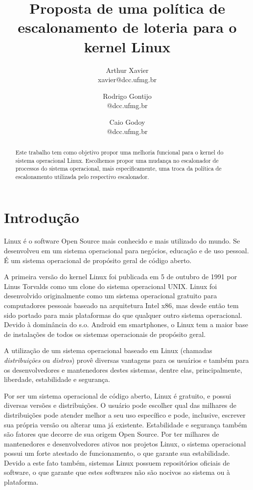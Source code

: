 \documentclass[a4paper,12pt]{article}
\title{Proposta de uma política de escalonamento de loteria para o kernel Linux}
\author{
    Arthur Xavier\\
    \small{xavier@dcc.ufmg.br}
    \and
    Rodrigo Gontijo\\
    \small{@dcc.ufmg.br}
    \and
    Caio Godoy\\
    \small{@dcc.ufmg.br}
}
\begin{document}
\maketitle

\begin{abstract}
  Este trabalho tem como objetivo propor uma melhoria funcional para o kernel do sistema operacional Linux. Escolhemos propor uma mudança no escalonador de processos do sistema operacional, mais especificamente, uma troca da política de escalonamento utilizada pelo respectivo escalonador.
\end{abstract}

\section{Introdução}
Linux é o software Open Source mais conhecido e mais utilizado do mundo. Se desenvolveu em um sistema operacional para negócios, educação e de uso pessoal. É um sistema operacional de propósito geral de código aberto. \cite{Welsh1998}

A primeira versão do kernel Linux foi publicada em 5 de outubro de 1991 por Linus Torvalds como um clone do sistema operacional UNIX. Linux foi desenvolvido originalmente como um sistema operacional gratuito para computadores pessoais baseado na arquitetura Intel x86, mas desde então tem sido portado para mais plataformas do que qualquer outro sistema operacional. Devido à dominância do s.o. Android em smartphones, o Linux tem a maior base de instalações de todos os sistemas operacionais de propósito geral.

A utilização de um sistema operacional baseado em Linux (chamadas \emph{distribuições} ou \emph{distros}) provê diversas vantagens para os usuários e também para os desenvolvedores e mantenedores destes sistemas, dentre elas, principalmente, liberdade, estabilidade e segurança.

Por ser um sistema operacional de código aberto, Linux é gratuito, e possui diversas versões e distribuições. O usuário pode escolher qual das milhares de distribuições pode atender melhor a seu uso específico e pode, inclusive, escrever sua própria versão ou alterar uma já existente. Estabilidade e segurança também são fatores que decorre de sua origem Open Source. Por ter milhares de mantenedores e desenvolvedores ativos nos projetos Linux, o sistema operacional possui um forte atestado de funcionamento, o que garante sua estabilidade. Devido a este fato também, sistemas Linux possuem repositórios oficiais de software, o que garante que estes softwares não são nocivos ao sistema ou à plataforma.
\end{document}

